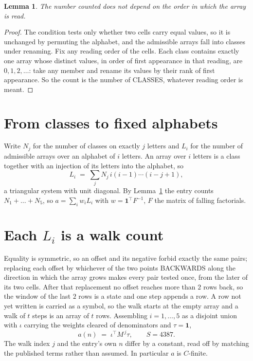 \documentclass[11pt,a4paper]{article}
\theoremstyle{plain}
\newtheorem{lemma}[theorem]{Lemma}
\theoremstyle{definition}
\begin{document}
\begin{lemma}\label{lem:order}
The number counted does not depend on the order in which the array is read.
\end{lemma}

\begin{proof}
The condition tests only whether two cells carry equal values, so it is unchanged by permuting
the alphabet, and the admissible arrays fall into classes under renaming. Fix any reading order
of the cells. Each class contains exactly one array whose distinct values, in order of first
appearance in that reading, are $0,1,2,\dots$: take any member and rename its values by their
rank of first appearance. So the count is the number of CLASSES, whatever reading order is
meant.
\end{proof}

\section{From classes to fixed alphabets}

Write $N_j$ for the number of classes on exactly $j$ letters and $L_i$ for the number of
admissible arrays over an alphabet of $i$ letters. An array over $i$ letters is a class together
with an injection of its letters into the alphabet, so
\[
L_i\;=\;\sum_j N_j\,i(i-1)\cdots(i-j+1),
\]
a triangular system with unit diagonal. By Lemma~\ref{lem:order} the entry counts
$N_1+\dots+N_{5}$, so $a=\sum_i w_iL_i$ with $w=\mathbf{1}^{\!\top}F^{-1}$, $F$ the
matrix of falling factorials.

\section{Each $L_i$ is a walk count}

Equality is symmetric, so an offset and its negative forbid exactly the same pairs; replacing
each offset by whichever of the two points BACKWARDS along the direction in which the array
grows makes every pair tested once, from the later of its two cells. After that replacement no
offset reaches more than $2$ rows back, so the window of the last $2$
rows is a state and one step appends a row. A row not yet written is
carried as a symbol, so the walk starts at the empty array and a walk of $t$ steps is an array
of $t$ rows. Assembling $i=1,\dots,5$ as a disjoint union with $\iota$ carrying the
weights cleared of denominators and $\tau=\mathbf{1}$,
\[
a(n)\;=\;\iota^{\!\top}M^{\,j}\tau ,\qquad S=4387.
\]
The walk index $j$ and the entry's own $n$ differ by a constant, read off by matching the
published terms rather than assumed. In particular $a$ is $C$-finite.
\end{document}

